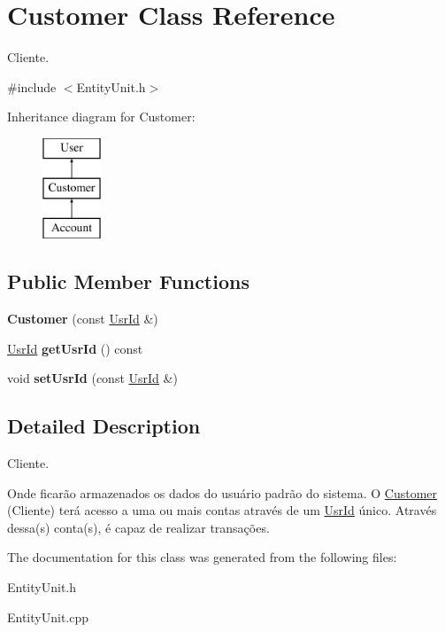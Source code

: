 \hypertarget{classCustomer}{\section{Customer Class Reference}
\label{classCustomer}
}


Cliente.  




{\ttfamily \#include $<$Entity\-Unit.\-h$>$}

Inheritance diagram for Customer\-:\begin{figure}[H]
\begin{center}
\leavevmode
\includegraphics[height=3.000000cm]{classCustomer}
\end{center}
\end{figure}
\subsection*{Public Member Functions}
\begin{DoxyCompactItemize}
\item 
\hypertarget{classCustomer_a0dff420b710e429da6501da5f820b0ba}{{\bfseries Customer} (const \hyperlink{classUsrId}{Usr\-Id} \&)}\label{classCustomer_a0dff420b710e429da6501da5f820b0ba}

\item 
\hypertarget{classCustomer_a76d325591ef27599cb1d7f3e4b77b8d4}{\hyperlink{classUsrId}{Usr\-Id} {\bfseries get\-Usr\-Id} () const }\label{classCustomer_a76d325591ef27599cb1d7f3e4b77b8d4}

\item 
\hypertarget{classCustomer_a89b74269a4750193d61b305b13df82fa}{void {\bfseries set\-Usr\-Id} (const \hyperlink{classUsrId}{Usr\-Id} \&)}\label{classCustomer_a89b74269a4750193d61b305b13df82fa}

\end{DoxyCompactItemize}


\subsection{Detailed Description}
Cliente. 

Onde ficarão armazenados os dados do usuário padrão do sistema. O \hyperlink{classCustomer}{Customer} (Cliente) terá acesso a uma ou mais contas através de um \hyperlink{classUsrId}{Usr\-Id} único. Através dessa(s) conta(s), é capaz de realizar transações. 

The documentation for this class was generated from the following files\-:\begin{DoxyCompactItemize}
\item 
Entity\-Unit.\-h\item 
Entity\-Unit.\-cpp\end{DoxyCompactItemize}
